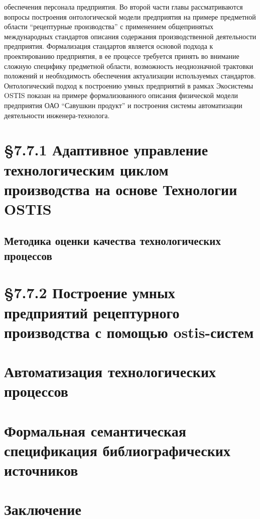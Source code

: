 \begin{small}
{обеспечения персонала предприятия.
Во второй части главы рассматриваются вопросы построения онтологической модели предприятия на примере предметной области “рецептурные производства” с применением общепринятых международных стандартов описания
содержания производственной деятельности предприятия. Формализация стандартов является основой подхода
к проектированию предприятия, в ее процессе требуется принять во внимание сложную специфику предметной
области, возможность неоднозначной трактовки положений и необходимость обеспечения актуализации используемых стандартов. Онтологический подход к построению умных предприятий в рамках Экосистемы OSTIS показан
на примере формализованного описания физической модели предприятия ОАО “Савушкин продукт” и построения
системы автоматизации деятельности инженера-технолога.}
\section*{\S 7.7.1 Адаптивное управление технологическим циклом производства на основе
Технологии OSTIS}
\end{small}
\begin{small}
\section*{Методика оценки качества технологических процессов}
\end{small}

\section*{\S 7.7.2 Построение умных предприятий рецептурного производства с помощью
ostis-систем}
\section*{Автоматизация технологических процессов}

\newpage
\section{Формальная семантическая спецификация библиографических источников}



\newpage
\section*{Заключение}

